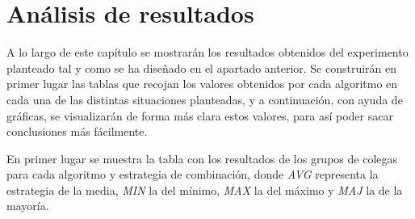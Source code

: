 \chapter{Análisis de resultados}

A lo largo de este capítulo se mostrarán los resultados obtenidos del experimento planteado tal y como se ha diseñado en el apartado anterior. Se construirán en primer lugar las tablas que recojan los valores obtenidos por cada algoritmo en cada una de las distintas situaciones planteadas, y a continuación, con ayuda de gráficas, se visualizarán de forma más clara estos valores, para así poder sacar conclusiones más fácilmente.

En primer lugar se muestra la tabla con los resultados de los grupos de colegas para cada algoritmo y estrategia de combinación, donde \textit{AVG} representa la estrategia de la media, \textit{MIN} la del mínimo, \textit{MAX} la del máximo y \textit{MAJ} la de la mayoría.

\begin{table}
	\centering
	\caption{Resultados obtenidos utilizando los grupos de colegas.}\label{t:resultados-colegas}
\end{table}

